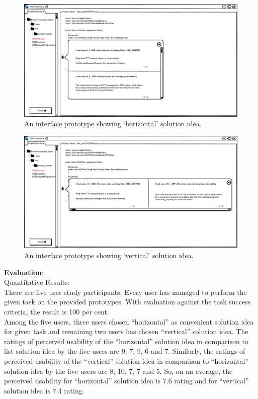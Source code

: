\begin{figure}[hbt!]
	\centering
	\includegraphics[width=\linewidth]{figures/solution_ideas_snaps/S31_horizontal}
	\caption{An interface prototype showing ‘horizontal’ solution idea.}
	\label{fig:S31_horizontal3}
\end{figure} 


\begin{figure}[hbt!]
	\centering
	\includegraphics[width=\linewidth]{figures/solution_ideas_snaps/S31_vertical}
	\caption{An interface prototype showing ‘vertical’ solution idea.}
	\label{fig:S31_vertical3}
\end{figure} 


\textbf{Evaluation}: \\

Quantitative Results: \\

There are five user study participants. Every user has managed to perform the given task on the provided prototypes. With evaluation against the task success criteria, the result is 100 per cent. \\

Among the five users, three users chosen “horizontal” as convenient solution idea for given task and remaining two users has chosen “vertical” solution idea. The ratings of perceived usability of the “horizontal” solution idea in comparison to list solution idea by the five users are 9, 7, 9, 6 and 7. Similarly, the ratings of perceived usability of the “vertical” solution idea in comparison to “horizontal” solution idea by the five users are 8, 10, 7, 7 and 5. So, on an average, the perceived usability for “horizontal” solution idea is 7.6 rating and for “vertical” solution idea is 7.4 rating. \\

